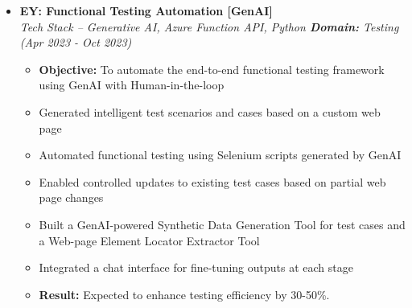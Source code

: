 \documentclass[a4paper,10pt]{article}
\newcommand{\isep}{-2 pt}
\begin{document}
\begin{itemize}
\item \textbf{EY: Functional Testing Automation [GenAI]}  \\
    \emph{Tech Stack -- Generative AI, Azure Function API, Python \qquad \textbf{Domain:} Testing} \hfill {\emph{(Apr 2023 - Oct 2023)}}
    \\[-0.6cm]
    \begin{itemize}\itemsep \isep
    \item \textbf{Objective:} To automate the end-to-end functional testing framework using GenAI with Human-in-the-loop
    \item Generated intelligent test scenarios and cases based on a custom web page
    \item Automated functional testing using Selenium scripts generated by GenAI
    \item Enabled controlled updates to existing test cases based on partial web page changes
    \item Built a GenAI-powered Synthetic Data Generation Tool for test cases and a Web-page Element Locator Extractor Tool
    \item Integrated a chat interface for fine-tuning outputs at each stage
    \item \textbf{Result:} Expected to enhance testing efficiency by 30-50\%. 
        \\ [-0.5cm]
    \end{itemize}


\end{itemize}
\end{document}
